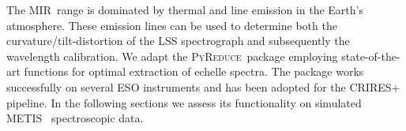 \newcommand{\pyred}{\textsc{PyReduce}}
\newcommand{\met}{\ac{METIS}}
\newcommand{\mir}{\ac{MIR}}
\newcommand{\lss}{\ac{LSS}}
\newcommand{\met}{\ac{ELT}}
\newcommand{\scope}{\textsc{ScopeSim}}


The \mir~range is dominated by thermal and line emission in the Earth's atmosphere. These emission lines can be used to determine both the curvature/tilt-distortion of the LSS spectrograph and subsequently the wavelength calibration. We adapt the \pyred~package \cite{pis21} employing state-of-the-art functions for optimal extraction of echelle spectra.  The package works successfully on several ESO instruments and has been adopted for the CRIRES+ pipeline. In the following sections we assess its functionality on simulated \met~ spectroscopic data.


